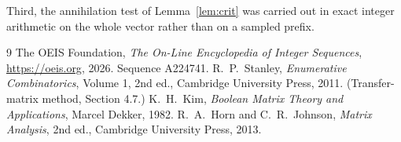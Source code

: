 \documentclass[11pt,a4paper]{article}
\theoremstyle{plain}
\theoremstyle{definition}
\begin{document}
Third, the annihilation test of Lemma~\ref{lem:crit} was carried out in exact integer
arithmetic on the whole vector rather than on a sampled prefix.

\begin{thebibliography}{9}
 The OEIS Foundation, \emph{The On-Line Encyclopedia of Integer
Sequences}, \url{https://oeis.org}, 2026. Sequence A224741.
 R.~P.~Stanley, \emph{Enumerative Combinatorics}, Volume 1, 2nd ed.,
Cambridge University Press, 2011. (Transfer-matrix method, Section 4.7.)
 K.~H.~Kim, \emph{Boolean Matrix Theory and Applications}, Marcel Dekker,
1982.
 R.~A.~Horn and C.~R.~Johnson, \emph{Matrix Analysis}, 2nd ed., Cambridge
University Press, 2013.
\end{thebibliography}
\end{document}
